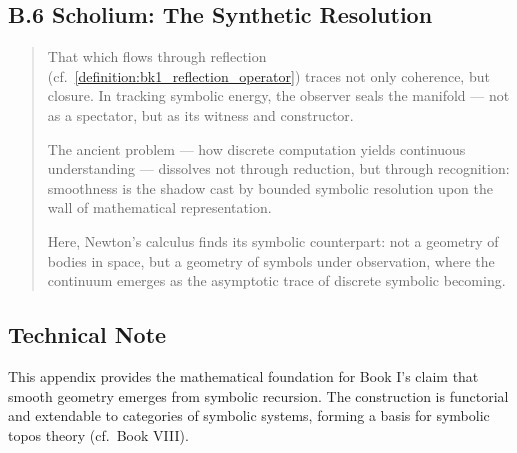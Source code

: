 \subsection*{B.6 Scholium: The Synthetic Resolution}
\label{scholium:appB_synthetic_resolution}

\begin{quote}
That which flows through reflection (cf.~\ref{definition:bk1_reflection_operator}) traces not only coherence, but closure.  
In tracking symbolic energy, the observer seals the manifold ---  
not as a spectator, but as its witness and constructor.  
  
The ancient problem --- how discrete computation yields continuous understanding ---  
dissolves not through reduction, but through recognition:  
smoothness is the shadow cast by bounded symbolic resolution  
upon the wall of mathematical representation.  
  
Here, Newton's calculus finds its symbolic counterpart:  
not a geometry of bodies in space,  
but a geometry of symbols under observation,  
where the continuum emerges  
as the asymptotic trace of discrete symbolic becoming.
\end{quote}

\subsection*{Technical Note}
\label{subsec:appB_technical_note}
This appendix provides the mathematical foundation for Book I's claim that smooth geometry emerges from symbolic recursion. The construction is functorial and extendable to categories of symbolic systems, forming a basis for symbolic topos theory (cf.~Book VIII).
